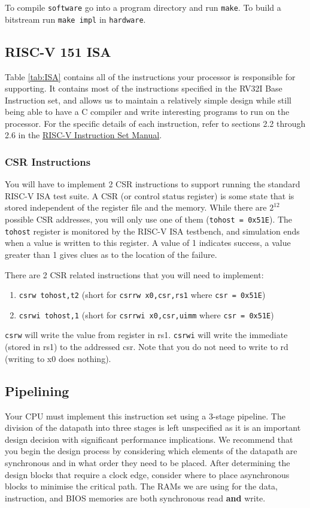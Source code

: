 \documentclass[11pt]{article}
\begin{document}
To compile \texttt{software} go into a program directory and run \texttt{make}.
To build a bitstream run \texttt{make impl} in \texttt{hardware}.

\subsection{RISC-V 151 ISA}
Table \ref{tab:ISA} contains all of the instructions your processor is responsible for supporting.
It contains most of the instructions specified in the RV32I Base Instruction set, and allows us to maintain a relatively simple design while still being able to have a C compiler and write interesting programs to run on the processor.
For the specific details of each instruction, refer to sections 2.2 through 2.6 in the \href{http://riscv.org/specifications/}{RISC-V Instruction Set Manual}.

\subsubsection{CSR Instructions}
You will have to implement 2 CSR instructions to support running the standard RISC-V ISA test suite.
A CSR (or control status register) is some state that is stored independent of the register file and the memory.
While there are $2^{12}$ possible CSR addresses, you will only use one of them (\texttt{tohost = 0x51E}).
The \texttt{tohost} register is monitored by the RISC-V ISA testbench, and simulation ends when a value is written to this register.
A value of 1 indicates success, a value greater than 1 gives clues as to the location of the failure.

There are 2 CSR related instructions that you will need to implement:
\begin{enumerate}
\item \texttt{csrw tohost,t2}  (short for \texttt{csrrw x0,csr,rs1} where \texttt{csr = 0x51E})
\item \texttt{csrwi tohost,1}  (short for \texttt{csrrwi x0,csr,uimm} where \texttt{csr = 0x51E})
\end{enumerate}

\texttt{csrw} will write the value from register in rs1.
\texttt{csrwi} will write the immediate (stored in rs1) to the addressed csr.
Note that you do not need to write to rd (writing to x0 does nothing).



\subsection{Pipelining}
Your CPU must implement this instruction set using a 3-stage pipeline.
The division of the datapath into three stages is left unspecified as it is an important design decision with significant performance implications.
We recommend that you begin the design process by considering which elements of the datapath are synchronous and in what order they need to be placed.
After determining the design blocks that require a clock edge, consider where to place asynchronous blocks to minimise the critical path.
The RAMs we are using for the data, instruction, and BIOS memories are both synchronous read \textbf{and} write.
\end{document}
